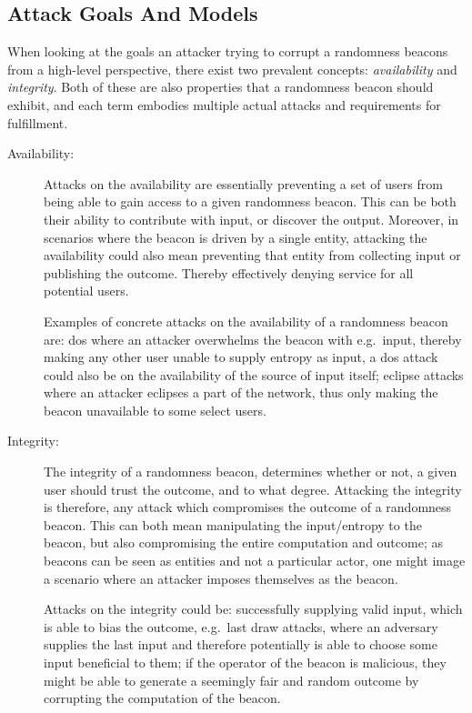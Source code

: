 \subsection{Attack Goals And Models}
\label{sub:attack_goals_and_models}
When looking at the goals an attacker trying to corrupt a randomness beacons from a high-level perspective, there exist two prevalent concepts: \emph{availability} and \emph{integrity}.
Both of these are also properties that a randomness beacon should exhibit, and each term embodies multiple actual attacks and requirements for fulfillment.

\begin{description}
    \item[Availability:]
        Attacks on the availability are essentially preventing a set of users from being able to gain access to a given randomness beacon.
        This can be both their ability to contribute with input, or discover the output.
        Moreover, in scenarios where the beacon is driven by a single entity, attacking the availability could also mean preventing that entity from collecting input or publishing the outcome.
        Thereby effectively denying service for all potential users.

        Examples of concrete attacks on the availability of a randomness beacon are:
        \acrfull{dos} where an attacker overwhelms the beacon with e.g.\ input, thereby making any other user unable to supply entropy as input, a \gls{dos} attack could also be on the availability of the source of input itself; eclipse attacks where an attacker eclipses a part of the network, thus only making the beacon unavailable to some select users.
    \item[Integrity:]
        The integrity of a randomness beacon, determines whether or not, a given user should trust the outcome, and to what degree.
        Attacking the integrity is therefore, any attack which compromises the outcome of a randomness beacon.
        This can both mean manipulating the input/entropy to the beacon, but also compromising the entire computation and outcome;
        as beacons can be seen as entities and not a particular actor, one might image a scenario where an attacker imposes themselves as the beacon.

        Attacks on the integrity could be: successfully supplying valid input, which is able to bias the outcome, e.g.\ last draw attacks, where an adversary supplies the last input and therefore potentially is able to choose some input beneficial to them; if the operator of the beacon is malicious, they might be able to generate a seemingly fair and random outcome by corrupting the computation of the beacon.
\end{description}


